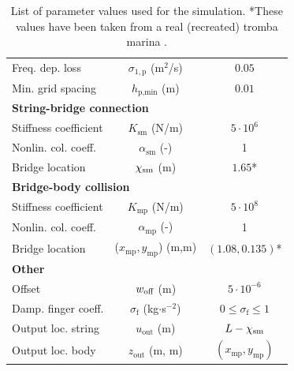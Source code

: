 \begin{table}[h!]
\begin{center}
\begin{tabular}{|l|c|c|}
        Freq. dep. loss & $\sigma_{1,\text{p}}$ (m$^2$/s)& $0.05$\\
        Min. grid spacing & $h_{\text{p},\text{min}}$ (m)& $0.01$\\ \hline
        \multicolumn{3}{|l|}{\bf String-bridge connection}\\\hline
        Stiffness coefficient & $K_\text{sm}$ (N/m) & $5\cdot10^{6}$\\
        Nonlin. col. coeff. &$\alpha_\text{sm}$ (-) & 1\\
        Bridge location & $\chi_\text{sm}$ (m)& $1.65$*\\
        \hline
        \multicolumn{3}{|l|}{\bf Bridge-body collision}\\\hline
        Stiffness coefficient & $K_\text{mp}$ (N/m) & $5\cdot10^{8}$\\
        Nonlin. col. coeff. &$\alpha_\text{mp}$ (-) & 1\\
        Bridge location & ($x_\text{mp},y_\text{mp}$) (m,m)& $(1.08,0.135)$*\\\hline
        \multicolumn{3}{|l|}{\bf Other}\\\hline
        Offset & $w_\text{off}$ (m) & $5\cdot 10^{-6}$\\
        Damp. finger coeff. &$\sigma_\text{f}$ (kg$\cdot$s$^{-2}$)&$0\leq \sigma_\text{f} \leq 1$\\
        Output loc. string & $u_\text{out}$ (m) & $L - \chi_\text{sm}$\\
        Output loc. body & $z_\text{out}$ (m, m) & $(x_\text{mp},y_\text{mp})$\\
        \hline
    \end{tabular}
    \caption{List of parameter values used for the simulation. *These values have been taken from a real (recreated) tromba marina \cite{Baldwin2016:SMC2020}.\label{tab:parameters}}
    \end{center}
    \end{table}
